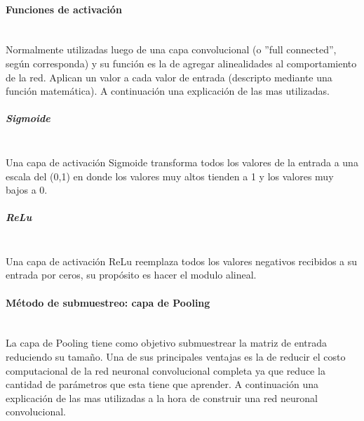 \paragraph{Funciones de activación}\mbox{}\\

Normalmente utilizadas luego de una capa convolucional (o ''full connected'', según corresponda) y su función es la de agregar alinealidades al comportamiento de la red. Aplican un valor a cada valor de entrada (descripto mediante una función matemática). A continuación una explicación de las mas utilizadas.\par

\subparagraph{Sigmoide}\mbox{}\\

Una capa de activación Sigmoide transforma todos los valores de la entrada a una escala del (0,1) en donde los valores muy altos tienden a 1 y los valores muy bajos a 0.

\begin{figure}[!h]
\centering
\scalebox{.5}{ }
\label{fig:sigmoide}
\end{figure}

\subparagraph{ReLu}\mbox{}\\

Una capa de activación ReLu reemplaza todos los valores negativos recibidos a su entrada por ceros, su propósito es hacer el modulo alineal.

\begin{figure}[!h]
\centering
\scalebox{.5}{ }
\label{fig:relu}
\end{figure}

\paragraph{Método de submuestreo: capa de Pooling}\mbox{}\\

La capa de Pooling tiene como objetivo submuestrear la matriz de entrada reduciendo su tamaño. Una de sus principales ventajas es la de reducir el costo computacional de la red neuronal convolucional completa ya que reduce la cantidad de parámetros que esta tiene que aprender. A continuación una explicación de las mas utilizadas a la hora de construir una red neuronal convolucional. \par 

